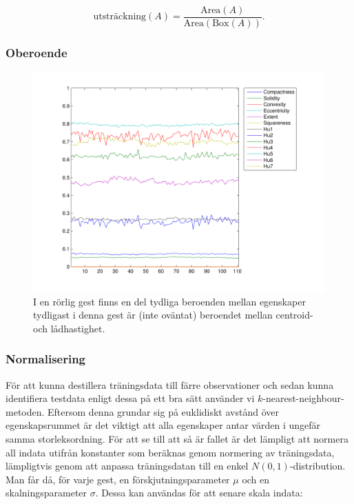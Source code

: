 \documentclass[../rapport_MVEX01-11-05]{subfiles}
\begin{document}
\begin{equation*}
  \textrm{utsträckning}(A) =
  \frac{\textrm{Area}(A)}{\textrm{Area}(\textrm{Box}(A))}.
\end{equation*}

\subsubsection{Oberoende}

\begin{figure}[htbp]
	\centering
	\includegraphics[width=\textwidth]{bilder/feat-move}
	\caption{I en rörlig gest finns en del tydliga beroenden mellan egenskaper
	tydligast i denna gest är (inte oväntat) beroendet mellan centroid- och
	lådhastighet.}
	\label{fig:featmove}
\end{figure}


\subsubsection{Normalisering}

För att kunna destillera träningsdata till färre observationer och sedan
kunna identifiera testdata enligt dessa på ett bra sätt använder vi
$k$-nearest-neighbour-metoden. Eftersom denna grundar sig på euklidiskt
avstånd över egenskapsrummet är det viktigt att alla egenskaper antar värden
i ungefär samma storleksordning. För att se till att så är fallet är det
lämpligt att normera all indata utifrån konstanter som beräknas genom
normering av träningsdata, lämpligtvis genom att anpassa träningsdatan till en
enkel $N(0,1)$-distribution. Man får då, för varje gest, en
förskjutningsparameter $\mu$ och en skalningsparameter $\sigma$. Dessa kan
användas för att senare skala indata:
\end{document}
